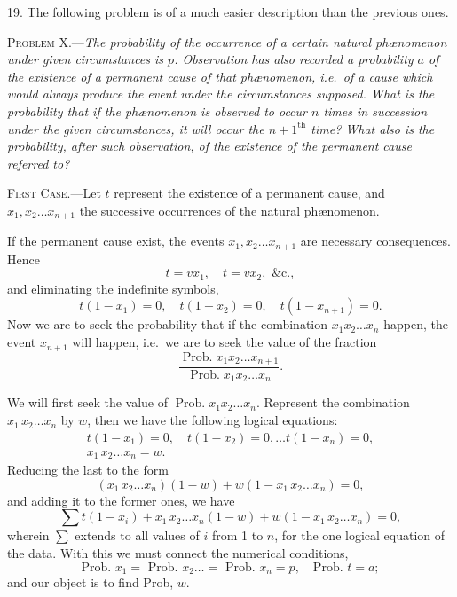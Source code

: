 \documentclass[oneside]{book}
\begin{document}
19. The following problem is of a much easier description
than the previous ones.

\textsc{Problem} X.---\emph{The probability of the occurrence of a certain
natural ph\ae nomenon under given circumstances is $p$. Observation
has also recorded a probability $a$ of the existence of a permanent
cause of that ph\ae nomenon, i.e.\ of a cause which would always
produce the event under the circumstances supposed. What is the
probability that if the ph\ae nomenon is observed to occur $n$ times in
succession under the given circumstances, it will occur the ${n+1}^{\text{th}}$
time? What also is the probability, after such observation, of the
existence of the permanent cause referred to?}

\textsc{First Case}.---Let $t$ represent the existence of a permanent
cause, and $x_1, x_2\dotsc x_{n+1}$ the successive occurrences of the natural
ph\ae nomenon.

If the permanent cause exist, the events $x_1, x_2\dots x_{n+1}$ are
necessary consequences. Hence
\begin{equation*}
t=v x_1, \quad t=v x_2, \text{ \&c.},
\end{equation*}
and eliminating the indefinite symbols,
\begin{equation*}
t(1-x_1)=0, \quad t(1-x_2)=0, \quad t(1-x_{n+1})=0.
\end{equation*}
Now we are to seek the probability that if the combination
$x_1 x_2 \dotsc x_n$ happen, the event $x_{n+1}$ will happen, i.e.\ we are to seek
the value of the fraction
\begin{equation*}
\frac{\operatorname{Prob. } x_1 x_2 \dotsc x_{n+1}}
     {\operatorname{Prob. } x_1 x_2 \dotsc x_n    }.
\end{equation*}

We will first seek the value of
$\operatorname{Prob. } x_1 x_2 \dotsc x_n$.
Represent the combination $x_1\, x_2 \dotsc x_n$ by $w$, then we have the
following logical equations:
\begin{gather*}
  t(1-x_1) = 0,\quad t(1-x_2) = 0, \dotsc t(1-x_n) = 0,   \\
  x_1\, x_2 \dotsc x_n = w.
\end{gather*}
Reducing the last to the form
\[
  (x_1\, x_2 \dotsc x_n)(1-w) + w(1 - x_1\, x_2 \dotsc x_n) = 0,
\]
and adding it to the former ones, we have
\[
  \sum t(1-x_i) + x_1\, x_2 \dotsc x_n(1-w)
  + w(1- x_1\, x_2 \dotsc x_n) = 0, \tag{1}
\]
wherein $\sum$ extends to all values of $i$ from 1 to $n$, for the one logical equation of the data. With this we must connect the numerical conditions,
\[
  \text{Prob. }x_1 = \text{ Prob. }x_2 \dotso
  = \text{ Prob. }x_n = p,\quad \text{Prob. }t = a;
\]
and our object is to find Prob, $w$.
\end{document}
